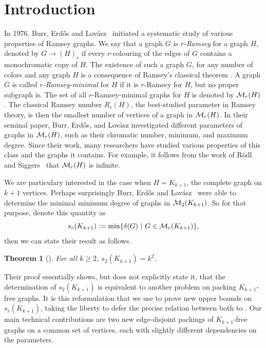 \documentclass[12pt]{article}
\newcommand{\cM}{{\cal M}}
\newtheorem{theorem}{Theorem}
\theoremstyle{definition}
\begin{document}
	\section{Introduction}
	
	In 1976, Burr, Erd\H{o}s and Lov\'asz~\cite{burr1976graphs} initiated a systematic study of various properties of Ramsey graphs. We say that a graph $G$ is {\em $r$-Ramsey} for a graph $H$, denoted by $G \to (H)_r$ if every $r$-colouring of the edges of $G$ contains a monochromatic copy of $H$. The existence of such a graph $G$, for any number of colors and any graph $H$ is a consequence of Ramsey's classical theorem \cite{ramsey1987problem}. A graph $G$ is called {\em $r$-Ramsey-minimal} for $H$ if it is $r$-Ramsey for $H$, but no proper subgraph is. The set of all $r$-Ramsey-minimal graphs for $H$ is denoted by $\cM_r(H)$. The classical Ramsey number $R_r(H)$, the best-studied parameter in Ramsey theory, is then the smallest number of vertices of a graph in $\cM_r(H)$. In their seminal paper, Burr, Erd\H{o}s, and Lov\'asz investigated different parameters of graphs in $\cM_r(H)$, such as their chromatic number, minimum, and maximum degree. Since their work, many researchers have studied various properties of this class and the graphs it contains. For example, it follows from the work of R\"odl and Siggers~\cite{RS08} that $\cM_r(H)$ is infinite. 
	
	We are particulary interested in the case when $H = K_{k+1}$, the complete graph on $k+1$ vertices. Perhaps surprisingly Burr, Erd\H{o}s and Lov\'asz~\cite{burr1976graphs} were able to determine the minimal minimum degree of graphs in $\cM_2(K_{k+1})$.
	So for that purpose, denote this quantity as
	\[s_r(K_{k+1}) := \min\{\delta(G) \,\, | \,\, G \in \cM_r(K_{k+1})\},\]
	then we can state their result as follows.
	
	\begin{theorem}[\cite{burr1976graphs}]
		For all $k \geq 2$, $s_2(K_{k+1}) = k^2$.
	\end{theorem}
	
	Their proof essentially shows, but does not explicitly state it, that the determination of $s_2(K_{k+1})$ is equivalent to another problem on packing $K_{k+1}$-free graphs. It is this reformulation that we use to prove new upper bounds on $s_r(K_{k+1})$, taking the liberty to defer the precise relation between both to . Our main technical contributions are two new edge-disjoint packings of $K_{k+1}$-free graphs on a common set of vertices, each with slightly different dependencies on the parameters.
	
\end{document}
